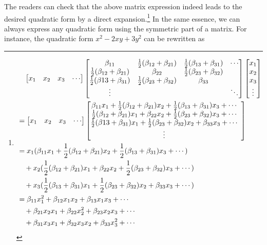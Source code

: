 The readers can check that the above matrix expression indeed leads to the desired quadratic form by a direct expansion.\footnote{\begin{align*}
&\quad \begin{bmatrix}
x_1 & x_2 & x_3 & \cdots
\end{bmatrix}
\left[\begin{array}{@{}cccc@{}}
\beta_{11} & \frac{1}{2}(\beta_{12} + \beta_{21}) & \frac{1}{2}(\beta_{13} + \beta_{31}) & \cdots \\
\frac{1}{2}(\beta_{12} + \beta_{21}) & \beta_{22} & \frac{1}{2}(\beta_{23} + \beta_{32}) &  \\
\frac{1}{2}(\beta{13} + \beta_{31}) & \frac{1}{2}(\beta_{23} + \beta_{32}) & \beta_{33} &  \\
\vdots & & & \ddots
\end{array}\right]
\begin{bmatrix}
x_1 \\
x_2 \\
x_3 \\
\vdots
\end{bmatrix} \\
&=
\begin{bmatrix}
x_1 & x_2 & x_3 & \cdots
\end{bmatrix}
\left[\begin{array}{@{}cccc@{}}
\beta_{11}x_1 + \frac{1}{2}(\beta_{12} + \beta_{21})x_2 + \frac{1}{2}(\beta_{13} + \beta_{31})x_3 + \cdots \\
\frac{1}{2}(\beta_{12} + \beta_{21})x_1 + \beta_{22}x_2 + \frac{1}{2}(\beta_{23} + \beta_{32})x_3 + \cdots  \\
\frac{1}{2}(\beta{13} + \beta_{31})x_1 + \frac{1}{2}(\beta_{23} + \beta_{32})x_2 + \beta_{33}x_3 + \cdots \\
\vdots 
\end{array}\right] \\
&= x_1(\beta_{11}x_1 + \frac{1}{2}(\beta_{12} + \beta_{21})x_2 + \frac{1}{2}(\beta_{13} + \beta_{31})x_3 + \cdots) \\
&\quad + x_2(\frac{1}{2}(\beta_{12} + \beta_{21})x_1 + \beta_{22}x_2 + \frac{1}{2}(\beta_{23} + \beta_{32})x_3 + \cdots) \\
&\quad + x_3(\frac{1}{2}(\beta_{13} + \beta_{31})x_1 + \frac{1}{2}(\beta_{23} + \beta_{32})x_2 + \beta_{33}x_3 + \cdots) \\
&= \beta_{11}x_1^2 + \beta_{12}x_1x_2 + \beta_{13}x_1x_3 + \cdots \\
&\quad + \beta_{21}x_2x_1 + \beta_{22}x_2^2 + \beta_{23}x_2x_3 + \cdots \\
&\quad + \beta_{31}x_3x_1 + \beta_{32}x_3x_2 + \beta_{33}x_3^2 + \cdots 
\end{align*}} In the same essence, we can always express any quadratic form using the symmetric part of a matrix. For instance, the quadratic form $x^2 - 2xy + 3y^2$ can be rewritten as
